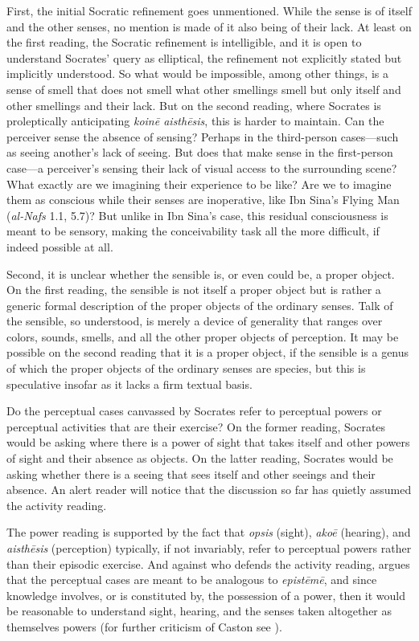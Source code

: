 First, the initial Socratic refinement goes unmentioned. While the sense is of itself and the other senses, no mention is made of it also being of their lack. At least on the first reading, the Socratic refinement is intelligible, and it is open to understand Socrates' query as elliptical, the refinement not explicitly stated but implicitly understood. So what would be impossible, among other things, is a sense of smell that does not smell what other smellings smell but only itself and other smellings and their lack. But on the second reading, where Socrates is proleptically anticipating \emph{koinē aisthēsis}, this is harder to maintain. Can the perceiver sense the absence of sensing? Perhaps in the third-person cases—such as seeing another's lack of seeing. But does that make sense in the first-person case—a perceiver's sensing their lack of visual access to the surrounding scene? What exactly are we imagining their experience to be like? Are we to imagine them as conscious while their senses are inoperative, like Ibn Sina's Flying Man (\emph{al-Nafs} 1.1, 5.7)? But unlike in Ibn Sina's case, this residual consciousness is meant to be sensory, making the conceivability task all the more difficult, if indeed possible at all.

Second, it is unclear whether the sensible is, or even could be, a proper object. On the first reading, the sensible is not itself a proper object but is rather a generic formal description of the proper objects of the ordinary senses. Talk of the sensible, so understood, is merely a device of generality that ranges over colors, sounds, smells, and all the other proper objects of perception. It may be possible on the second reading that it is a proper object, if the sensible is a genus of which the proper objects of the ordinary senses are species, but this is speculative insofar as it lacks a firm textual basis.

Do the perceptual cases canvassed by Socrates refer to perceptual powers or perceptual activities that are their exercise? On the former reading, Socrates would be asking where there is a power of sight that takes itself and other powers of sight and their absence as objects. On the latter reading, Socrates would be asking whether there is a seeing that sees itself and other seeings and their absence. An alert reader will notice that the discussion so far has quietly assumed the activity reading.

The power reading is supported by the fact that \emph{opsis} (sight), \emph{akoē} (hearing), and \emph{aisthēsis} (perception) typically, if not invariably, refer to perceptual powers rather than their episodic exercise. And against \citet[772–3]{caston02} who defends the activity reading, \citet[218 n18]{Tuozzo:2011aa} argues that the perceptual cases are meant to be analogous to \emph{epistēmē}, and since knowledge involves, or is constituted by, the possession of a power, then it would be reasonable to understand sight, hearing, and the senses taken altogether as themselves powers (for further criticism of Caston see \citealt{Johansen:2005hz}). 

